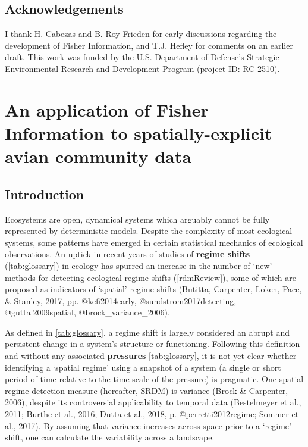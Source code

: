 \documentclass[12pt,twoside,openany]{reedthesis}
\begin{document}
\hypertarget{acknowledgements}{%
\section{Acknowledgements}\label{acknowledgements}}

I thank H. Cabezas and B. Roy Frieden for early discussions regarding the development of Fisher Information, and T.J. Hefley for comments on an earlier draft. This work was funded by the U.S. Department of Defense's Strategic Environmental Research and Development Program (project ID: RC-2510).

\hypertarget{fisherSpatial}{%
\chapter{An application of Fisher Information to spatially-explicit avian community data}\label{fisherSpatial}}

\hypertarget{introduction-2}{%
\section{Introduction}\label{introduction-2}}

Ecosystems are open, dynamical systems which arguably cannot be fully represented by deterministic models. Despite the complexity of most ecological systems, some patterns have emerged in certain statistical mechanics of ecological observations. An uptick in recent years of studies of \textbf{regime shifts} (\ref{tab:glossary}) in ecology has spurred an increase in the number of `new' methods for detecting ecological regime shifts (\ref{rdmReview}), some of which are proposed as indicators of `spatial' regime shifts (Butitta, Carpenter, Loken, Pace, \& Stanley, 2017, pp. @kefi2014early, @sundstrom2017detecting, @guttal2009spatial, @brock\_variance\_2006).

As defined in \ref{tab:glossary}, a regime shift is largely considered an abrupt and persistent change in a system's structure or functioning. Following this definition and without any associated \textbf{pressures} \ref{tab:glossary}, it is not yet clear whether identifying a `spatial regime' using a snapshot of a system (a single or short period of time relative to the time scale of the pressure) is pragmatic. One spatial regime detection measure (hereafter, SRDM) is variance (Brock \& Carpenter, 2006), despite its controversial applicability to temporal data (Bestelmeyer et al., 2011; Burthe et al., 2016; Dutta et al., 2018, p. @perretti2012regime; Sommer et al., 2017). By assuming that variance increases across space prior to a `regime' shift, one can calculate the variability across a landscape.
\end{document}
